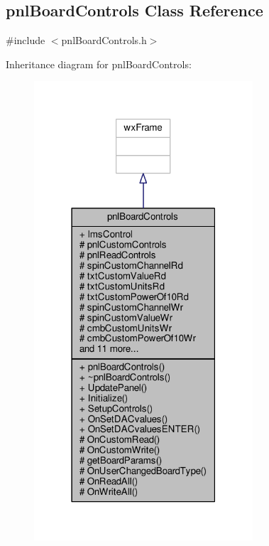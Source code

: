 \subsection{pnl\+Board\+Controls Class Reference}
\label{classpnlBoardControls}


{\ttfamily \#include $<$pnl\+Board\+Controls.\+h$>$}



Inheritance diagram for pnl\+Board\+Controls\+:
\nopagebreak
\begin{figure}[H]
\begin{center}
\leavevmode
\includegraphics[width=231pt]{d1/dd6/classpnlBoardControls__inherit__graph}
\end{center}
\end{figure}



